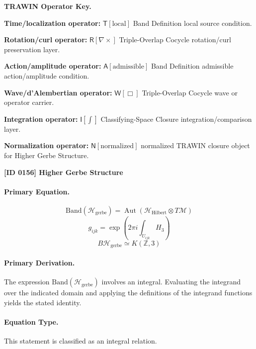 \par\vspace{0.45\baselineskip}
\noindent\begin{minipage}[t]{\linewidth}
\begingroup
\small
\raggedright
\textbf{TRAWIN Operator Key.}\par
\noindent\textbf{Time/localization operator:} $\mathsf{T}\!\left[\mathrm{local}\right]$ Band Definition local source condition.\par
\noindent\textbf{Rotation/curl operator:} $\mathsf{R}\!\left[\nabla\times\right]$ Triple-Overlap Cocycle rotation/curl preservation layer.\par
\noindent\textbf{Action/amplitude operator:} $\mathsf{A}\!\left[\mathrm{admissible}\right]$ Band Definition admissible action/amplitude condition.\par
\noindent\textbf{Wave/d'Alembertian operator:} $\mathsf{W}\!\left[\Box\right]$ Triple-Overlap Cocycle wave or operator carrier.\par
\noindent\textbf{Integration operator:} $\mathsf{I}\!\left[\int\right]$ Classifying-Space Closure integration/comparison layer.\par
\noindent\textbf{Normalization operator:} $\mathsf{N}\!\left[\mathrm{normalized}\right]$ normalized TRAWIN closure object for Higher Gerbe Structure.\par
\endgroup
\end{minipage}

\clearpage
\noindent\textbf{[ID 0156] Higher Gerbe Structure}\par
\vspace{0.35em}
\paragraph{Primary Equation.}
\[
\mathrm{Band}(\mathcal{H}_{\mathrm{gerbe}})
=
\operatorname{Aut}\!\left(\mathcal{H}_{\mathrm{Hilbert}}\otimes T\mathcal{M}\right)
\]
\[
g_{ijk}
=
\exp\!\left(2\pi i\int_{U_{ijk}} H_3\right)
\]
\[
B\mathcal{H}_{\mathrm{gerbe}}\simeq K(\mathbb{Z},3)
\]

\paragraph{Primary Derivation.}
The expression \( \mathrm{Band}(\mathcal{H}_{\mathrm{gerbe}}) \) involves an integral. Evaluating the integrand over the indicated domain and applying the definitions of the integrand functions yields the stated identity.
\paragraph{Equation Type.}
This statement is classified as an integral relation.

